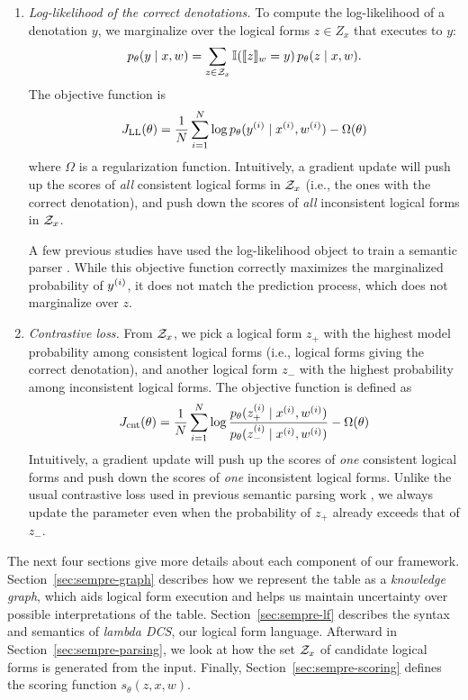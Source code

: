\begin{enumerate}
\item \emph{Log-likelihood of the correct denotations.}
To compute the log-likelihood of a denotation $y$,
we marginalize
over the logical forms $z \in Z_{x}$
that executes to $y$:
\begin{equation}
p_\theta(y \mid x, w) =
\sum_{z\in \mathcal{Z}_x} \mathbb{I}(\llbracket{z}\rrbracket_{w} = y)\,p_\theta(z \mid x, w).
\end{equation}
The objective function is
\begin{equation}
J_\mathrm{LL}(\theta) = 
\frac{1}{N} \sum_{i=1}^N \log p_\theta(y^{(i)}\mid x^{(i)}, w^{(i)})
- \Omega(\theta)
\label{eqn:sempre-log-likelihood}
\end{equation}
where $\Omega$ is a regularization function.
Intuitively, a gradient update
will push up the scores of \emph{all}
consistent logical forms in $\mathcal{Z}_x$
(i.e., the ones with the correct denotation),
and push down the scores of \emph{all}
inconsistent logical forms in $\mathcal{Z}_x$.

A few previous studies have used
the log-likelihood object to train a semantic parser
\cite{kwiatkowski11lex,liang11dcs,berant2013freebase}.
While this objective function correctly maximizes
the marginalized probability of $y^{(i)}$,
it does not match the prediction process,
which does not marginalize over $z$.

\item \emph{Contrastive loss.}
From $\mathcal{Z}_x$,
we pick a logical form $z_+$
with the highest model probability among consistent
logical forms (i.e., logical forms giving the correct denotation),
and another logical form $z_-$ with the highest
probability among inconsistent logical forms.
The objective function is defined as
\begin{equation}
J_\mathrm{cnt}(\theta) =
\frac{1}{N} \sum_{i=1}^N \log
\frac{p_\theta(z^{(i)}_+\mid x^{(i)}, w^{(i)})}{p_\theta(z^{(i)}_-\mid x^{(i)}, w^{(i)})}
- \Omega(\theta)
\end{equation}
Intuitively, a gradient update
will push up the scores of \emph{one}
consistent logical forms
and push down the scores of \emph{one}
inconsistent logical forms.
Unlike the usual contrastive loss
used in previous semantic parsing work
\cite{zettlemoyer07relaxed,zettlemoyer09context},
we always update the parameter
even when the probability of $z_+$
already exceeds that of $z_-$.
\end{enumerate}

The next four sections give more details about
each component of our framework.
Section~\ref{sec:sempre-graph} describes
how we represent the table as a \emph{knowledge graph},
which aids logical form execution and
helps us maintain uncertainty
over possible interpretations of the table.
Section~\ref{sec:sempre-lf} describes the syntax and semantics
of \emph{lambda DCS}, our logical form language.
Afterward in Section~\ref{sec:sempre-parsing},
we look at how the
set $\mathcal{Z}_x$ of candidate logical forms is generated from the input.
Finally, Section~\ref{sec:sempre-scoring}
defines the scoring function $s_\theta(z, x, w)$.

